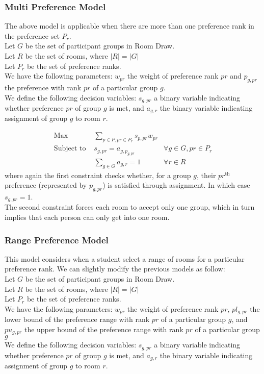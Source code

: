 \documentclass[12pt]{article}
\begin{document}
    \subsubsection*{Multi Preference Model}
    The above model is applicable when there are more than one preference rank in the preference set $P_r$. \\
    Let $G$ be the set of participant groups in Room Draw. \\
    Let $R$ be the set of rooms, where $|R| = |G|$ \\
    Let $P_r$ be the set of preference ranks. \\
We have the following parameters: $w_{pr}$ the weight of preference rank $pr$ and $p_{g,pr}$ the preference with rank $pr$ of a particular group $g$. \\
    We define the following decision variables: $s_{g,pr}$ a binary variable indicating whether preference $pr$ of group $g$ is met, and $a_{g,r}$ the binary variable indicating assignment of group $g$ to room $r$. 
    
    \begin{align*}
    \text{Max} &\sum_{p \in P, pr \in P_r} s_{p,pr}w_{pr}    \\
    \text{Subject to } &s_{g,pr} = a_{g,p_{g,pr}} &\forall g \in G, pr \in P_r\\ 
    &\sum_{g \in G} a_{g,r} = 1 &\forall r \in R
    \end{align*}
    where again the first constraint checks whether, for a group $g$, their $pr^{\text{th}}$ preference (represented by $p_{g,pr}$) is satisfied through assignment. In which case $s_{g,pr} = 1$. \\
    The second constraint forces each room to accept only one group, which in turn implies that each person can only get into one room.


    \subsubsection*{Range Preference Model}
    This model considers when a student select a range of rooms for a particular preference rank. We can slightly modify the previous models as follow: \\
     Let $G$ be the set of participant groups in Room Draw. \\
    Let $R$ be the set of rooms, where $|R| = |G|$ \\
    Let $P_r$ be the set of preference ranks. \\
We have the following parameters: $w_{pr}$ the weight of preference rank $pr$, $pl_{g,pr}$ the lower bound of the preference range with rank $pr$ of a particular group $g$, and $pu_{g,pr}$ the upper bound of the preference range with rank $pr$ of a particular group $g$\\
    We define the following decision variables: $s_{g,pr}$ a binary variable indicating whether preference $pr$ of group $g$ is met, and $a_{g,r}$ the binary variable indicating assignment of group $g$ to room $r$. 
    
\end{document}
